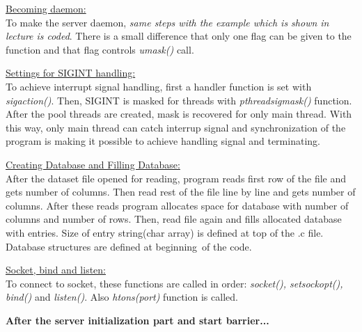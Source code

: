 \documentclass[12pt]{report}
\renewcommand{\_}{\kern-1.5pt\textunderscore\kern-1.5pt}
\begin{document}
\vspace{\baselineskip}
\begin{FlushLeft}
\uline{Becoming daemon:}\\
To make the server daemon, \textit{same steps with the example which is shown in lecture is coded}. There is a small difference that only one flag can be given to the function and that flag controls \textit{umask()} call.
\end{FlushLeft}

\vspace{\baselineskip}
\begin{FlushLeft}
\uline{Settings for SIGINT handling:}\\
To achieve interrupt signal handling, first a handler function is set with \textit{sigaction()}. Then, SIGINT is masked for threads with \textit{pthread\_sigmask() }function. After the pool threads are created, mask is recovered for only main thread. With this way, only main thread can catch interrup signal and synchronization of the program is making it possible to achieve handling signal and terminating.
\end{FlushLeft}

\vspace{\baselineskip}
\begin{FlushLeft}
\uline{Creating Database and Filling Database:}\\
After the dataset file opened for reading, program reads first row of the file and gets number of columns. Then read rest of the file line by line and gets number of columns. After these reads program allocates space for database with number of columns and number of rows. Then, read file again and fills allocated database with entries. Size of entry string(char array) is defined at top of the .c file. Database structures are defined at beginning\  of the code.
\end{FlushLeft}

\vspace{\baselineskip}
\begin{FlushLeft}
\uline{Socket, bind and listen:}\\
To connect to socket, these functions are called in order: \textit{socket(), setsockopt(), bind()} and \textit{listen()}.  Also \textit{htons(port)} function is called.
\end{FlushLeft}
\begin{FlushLeft}
\textbf{After the server initialization part and start barrier...}
\end{FlushLeft}
\end{document}
